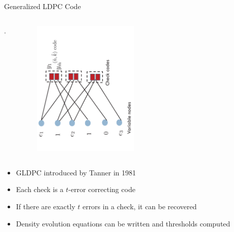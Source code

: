 \documentclass[10pt,xcolor=table]{beamer}
\begin{document}
\begin{frame}{Generalized LDPC Code}

\begin{columns}
    .
    \begin{figure}[t]
    \centering
    \includegraphics[width=2.0in,angle=-90]{./Figures/GLDPC}
    \end{figure}
\end{columns}

\begin{itemize}
\item GLDPC introduced by Tanner in 1981
\item Each check is a $t$-error correcting code
\item If there are exactly $t$ errors in a check, it can be recovered
\item Density evolution equations can be written and thresholds computed
\end{itemize}

\end{frame}
\end{document}
